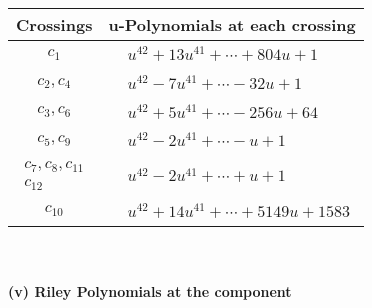 \documentclass[1p]{elsarticle_modified}
\theoremstyle{definition}
\begin{document}
\begin{tabular}{m{50pt}|m{274pt}}
Crossings & \hspace{64pt}u-Polynomials at each crossing \\
\hline $$\begin{aligned}c_{1}\end{aligned}$$&$\begin{aligned}
&u^{42}+13 u^{41}+\cdots+804 u+1
\end{aligned}$\\
\hline $$\begin{aligned}c_{2},c_{4}\end{aligned}$$&$\begin{aligned}
&u^{42}-7 u^{41}+\cdots-32 u+1
\end{aligned}$\\
\hline $$\begin{aligned}c_{3},c_{6}\end{aligned}$$&$\begin{aligned}
&u^{42}+5 u^{41}+\cdots-256 u+64
\end{aligned}$\\
\hline $$\begin{aligned}c_{5},c_{9}\end{aligned}$$&$\begin{aligned}
&u^{42}-2 u^{41}+\cdots- u+1
\end{aligned}$\\
\hline $$\begin{aligned}c_{7},c_{8},c_{11}\\c_{12}\end{aligned}$$&$\begin{aligned}
&u^{42}-2 u^{41}+\cdots+u+1
\end{aligned}$\\
\hline $$\begin{aligned}c_{10}\end{aligned}$$&$\begin{aligned}
&u^{42}+14 u^{41}+\cdots+5149 u+1583
\end{aligned}$\\
\hline
\end{tabular}\\~\\
\newpage\renewcommand{\arraystretch}{1}
\flushleft \textbf{(v) Riley Polynomials at the component}\newline \\
\end{document}
